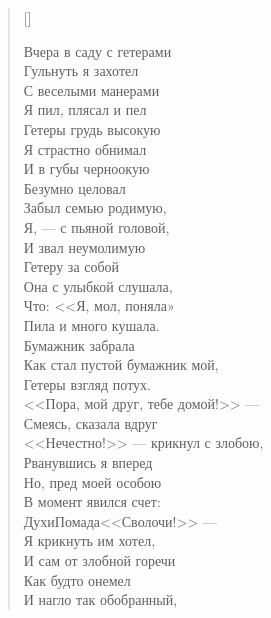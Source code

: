 \newpage
\vspace*{-2.5cm}


\settowidth{\versewidth}{Вчера в саду с гетерами}
\begin{verse}[\versewidth]
\begin{altverse}
Вчера в саду с гетерами\\
     Гульнуть я захотел\ldotst\\
С веселыми манерами\\
     Я пил, плясал и пел\ldotst\\
Гетеры грудь высокую\\
     Я страстно обнимал\\
И в губы черноокую\\
     Безумно целовал\ldotst\\
Забыл семью родимую,\\
     Я, --- с пьяной головой,\\
И звал неумолимую\\
     Гетеру за собой\ldotst\\
Она с улыбкой слушала,\\
     Что: <<Я, мол, поняла»\ldotst\\
Пила и много кушала.\\
     Бумажник забрала\ldotst\\
Как стал пустой бумажник мой,\\
     Гетеры взгляд потух.\\
<<Пора, мой друг, тебе домой!>> ---\\
      Смеясь, сказала вдруг\ldotst\\
<<Нечестно!>> --- крикнул с злобою,\\
     Рванувшись я вперед\ldotst\\
Но, пред моей особою\\
     В момент явился счет:\\
Духи\ldotst Помада\ldotst <<Сволочи!>> ---\\
     Я крикнуть им хотел,\\
И сам от злобной горечи\\
     Как будто онемел\ldotst\\
И нагло так обобранный,\\

\end{altverse}
\end{verse}
